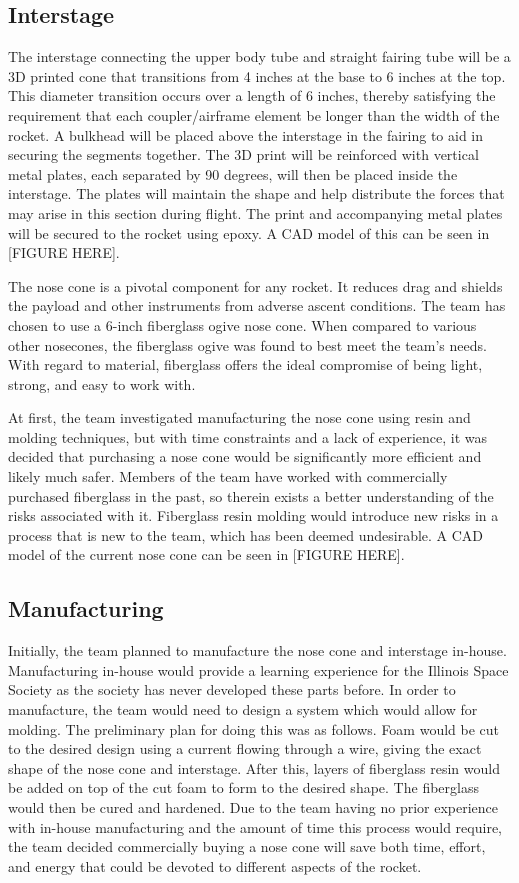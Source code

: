     \subsection{Interstage}
The interstage connecting the upper body tube and straight fairing tube will be a 3D printed cone that transitions from 4 inches at the base to 6 inches at the top. This diameter transition occurs over a length of 6 inches, thereby satisfying the requirement that each coupler/airframe element be longer than the width of the rocket. A bulkhead will be placed above the interstage in the fairing to aid in securing the segments together. The 3D print will be reinforced with vertical metal plates, each separated by 90 degrees, will then be placed inside the interstage. The plates will maintain the shape and help distribute the forces that may arise in this section during flight. The print and accompanying metal plates will be secured to the rocket using epoxy. A CAD model of this can be seen in [FIGURE HERE].

The nose cone is a pivotal component for any rocket. It reduces drag and shields the payload and other instruments from adverse ascent conditions. The team has chosen to use a 6-inch fiberglass ogive nose cone. When compared to various other nosecones, the fiberglass ogive was found to best meet the team’s needs. With regard to material, fiberglass offers the ideal compromise of being light, strong, and easy to work with.

At first, the team investigated manufacturing the nose cone using resin and molding techniques, but with time constraints and a lack of experience, it was decided that purchasing a nose cone would be significantly more efficient and likely much safer. Members of the team have worked with commercially purchased fiberglass in the past, so therein exists a better understanding of the risks associated with it. Fiberglass resin molding would introduce new risks in a process that is new to the team, which has been deemed undesirable. A CAD model of the current nose cone can be seen in [FIGURE HERE].



    \subsection{Manufacturing}
    Initially, the team planned to manufacture the nose cone and interstage in-house. Manufacturing in-house would provide a learning experience for the Illinois Space Society as the society has never developed these parts before. In order to manufacture, the team would need to design a system which would allow for molding. The preliminary plan for doing this was as follows. Foam would be cut to the desired design using a current flowing through a wire, giving the exact shape of the nose cone and interstage. After this, layers of fiberglass resin would be added on top of the cut foam to form to the desired shape. The fiberglass would then be cured and hardened. Due to the team having no prior experience with in-house manufacturing and the amount of time this process would require, the team decided commercially buying a nose cone will save both time, effort, and energy that could be devoted to different aspects of the rocket.
    
